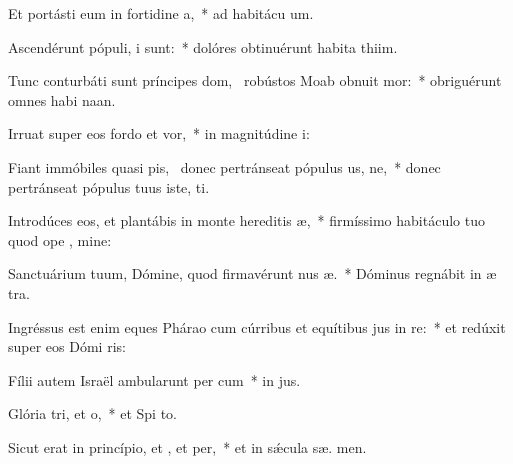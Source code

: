 \item Et portásti eum in fortidine a,~* ad habitácu  um.
\item Ascendérunt pópuli,  i sunt:~* dolóres obtinuérunt habita thiim.
\item Tunc conturbáti sunt príncipes dom,~\pscross{} robústos Moab obnuit mor:~* obriguérunt omnes habi naan.
\item Irruat super eos fordo et vor,~* in magnitúdine  i:
\item Fiant immóbiles quasi pis,~\pscross{} donec pertránseat pópulus us, ne,~* donec pertránseat pópulus tuus iste,  ti.
\item Introdúces eos, et plantábis in monte hereditis æ,~* firmíssimo habitáculo tuo quod ope , mine:
\item Sanctuárium tuum, Dómine, quod firmavérunt nus æ.~* Dóminus regnábit in æ  tra.
\item Ingréssus est enim eques Phárao cum cúrribus et equítibus jus in re:~* et redúxit super eos Dómi  ris:
\item Fílii autem Israël ambularunt per cum~* in  jus.
\item Glória tri, et o,~* et Spi to.
\item Sicut erat in princípio, et , et per,~* et in sǽcula sæ. men.

